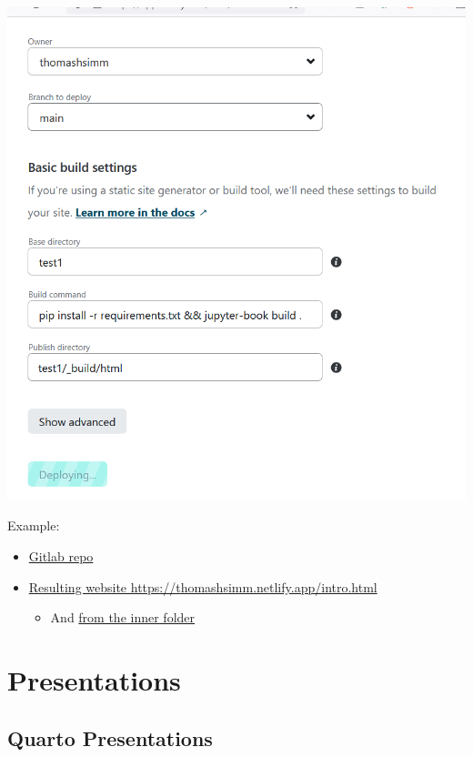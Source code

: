 \documentclass[
  letterpaper,
  DIV=11,
  numbers=noendperiod]{scrartcl}
\providecommand{\tightlist}{%
  \setlength{\itemsep}{0pt}\setlength{\parskip}{0pt}}\usepackage{longtable,booktabs,array}
\begin{document}
\includegraphics{ghtop_images/netlify.png}

Example:

\begin{itemize}
\tightlist
\item
  \href{https://gitlab.com/ThomasHSimm/test-presentation}{Gitlab repo}
\item
  \href{https://thomashsimm.netlify.app/intro.html}{Resulting website
  https://thomashsimm.netlify.app/intro.html}

  \begin{itemize}
  \tightlist
  \item
    And
    \href{https://63f518d4377f1f00084d90ce--jocular-hotteok-1484e4.netlify.app/intro.html}{from
    the inner folder}
  \end{itemize}
\end{itemize}

\hypertarget{presentations}{%
\section{Presentations}\label{presentations}}

\hypertarget{quarto-presentations}{%
\subsection{Quarto Presentations}\label{quarto-presentations}}
\end{document}
